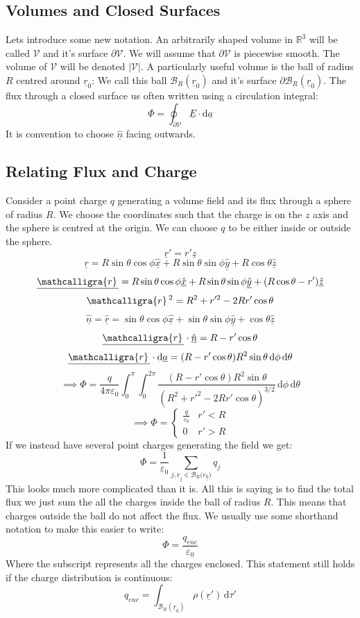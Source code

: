 \documentclass[12pt]{article}
\newcommand{\scriptr}{\ensuremath{\mathcalligra{r}}\,}
\begin{document}
\subsection{Volumes and Closed Surfaces}
Lets introduce some new notation. An arbitrarily shaped volume in \(\mathbb{R}^3\) will be called \(\mathcal{V}\) and it's surface \(\partial \mathcal{V}\). We will assume that \(\partial \mathcal{V}\) is piecewise smooth. The volume of \(\mathcal{V}\) will be denoted \(|\mathcal{V}|\). A particularly useful volume is the ball of radius \(R\) centred around \(\underline{r}_0\): We call this ball \(\mathcal{B}_R(\underline{r}_0)\) and it's surface \(\partial\mathcal{B}_R(\underline{r}_0)\). The flux through a closed surface us often written using a circulation integral:
\[\Phi=\oint_{\partial\mathcal{V}}\underline{E}\cdot\text{d}\underline{a}\]
It is convention to choose \(\underline{\hat{n}}\) facing outwards.
\subsection{Relating Flux and Charge}
Consider a point charge \(q\) generating a volume field  and its flux through a sphere of radius \(R\). We choose the coordinates such that the charge is on the \(z\) axis and the sphere is centred at the origin. We can choose \(q\) to be either inside or outside the sphere.
\[\underline{r}'=r'\underline{\hat{z}}\]
\[\underline{r}=R\sin\theta\cos\phi\underline{\hat{x}}+R\sin\theta\sin\phi\underline{\hat{y}}+R\cos\theta\underline{\hat{z}}\]
\[\underline{\scriptr}=R\sin\theta\cos\phi\underline{\hat{x}}+R\sin\theta\sin\phi\underline{\hat{y}}+(R\cos\theta-r')\underline{\hat{z}}\]
\[\scriptr^2=R^2+r'^2-2Rr'\cos\theta\]
\[\underline{\hat{n}}=\underline{\hat{r}}=\sin\theta\cos\phi\underline{\hat{x}}+\sin\theta\sin\phi\underline{\hat{y}}+\cos\theta\underline{\hat{z}}\]
\[\underline{\scriptr}\cdot\underline{\hat{n}}=R-r'\cos\theta\]
\[\underline{\scriptr}\cdot \text{d}\underline{a}=(R-r'\cos\theta)R^2\sin\theta\,\text{d}\phi\,\text{d}\theta\]
\[\implies \Phi=\frac{q}{4\pi\varepsilon_0}\int^\pi_0\int^{2\pi}_0\frac{(R-r'\cos\theta)R^2\sin\theta}{(R^2+r'^2-2Rr'\cos\theta)^{3/2}}\,\text{d}\phi\,\text{d}\theta\]
\[\implies\Phi=\begin{cases}
    \frac{q}{\varepsilon_0} & r'<R \\
    0 & r'>R
\end{cases}\]
If we instead have several point charges generating the field we get:
\[\Phi=\frac{1}{\varepsilon_0}\sum_{j,\underline{r}_j\in \mathcal{B}_R(\underline{r_0)}}q_j\]
This looks much more complicated than it is. All this is saying is to find the total flux we just sum the all the charges inside the ball of radius \(R\). This means that charges outside the ball do not affect the flux. We usually use some shorthand notation to make this easier to write:
\[\Phi=\frac{q_{enc}}{\varepsilon_0}\]
Where the subscript represents all the charges enclosed. This statement still holds if the charge distribution is continuous:
\[q_{enc}=\int_{\mathcal{B}_R(\underline{r}_0)}\rho(\underline{r}')\,\text{d}\tau'\]
\end{document}
